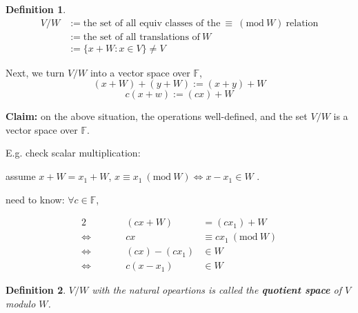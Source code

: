 \documentclass[12pt]{article}
\theoremstyle{plain}
\newtheorem{definition}{Definition}[subsection]
\newcommand{\mF}{{\mathbb{F}}}
\newcommand{\Mod}[1]{\ (\mathrm{mod}\ #1)}
\begin{document}
	\begin{definition}
		\begin{align*}
		V / W 
		&:= \text{the set of all equiv classes of the}\  \equiv \Mod W \ 
			\text{relation}\\
		&:= \text{the set of all translations of} \ W\\
		&:= \{x + W: x \in V\} \neq V
	\end{align*}		
	\end{definition}


	Next, we turn $V/W$ into a vector space over $\mF$, 
	\[
		(x + W) + (y + W) := (x + y) + W
	\]
	\[
		c (x + w) := (cx) + W
	\]
	
	\textbf{Claim:} on the above situation, the operations well-defined,
	and the set $V/W$ is a vector space over $\mF$. 

	E.g. check scalar multiplication: 

	assume $x + W = x_1 + W$, $x \equiv x_1 \Mod W \iff x - x_1 \in W$ . 

	need to know: $\forall c \in \mF$, 

	\begin{alignat*}{2}
					&	\qquad &	(cx + W)	&	= (cx_1) + W\\
	\Leftrightarrow &	\qquad &	cx			&	\equiv c x_1 \Mod W\\
	\Leftrightarrow &	\qquad &	(cx)-(cx_1) &	\in W\\
	\Leftrightarrow &	\qquad &	c(x-x_1)	&	\in W
	\end{alignat*}

	\begin{definition}
		$V/W$ with the natural opeartions is called the \textbf{quotient
		space} of $V$ modulo $W$. 
	\end{definition}



	


\end{document}
